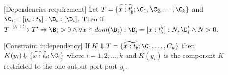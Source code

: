 \vspace{0.5cm}
\begin{proposition} [Dependencies requirement] Let $T=\{\widetilde{x:t_b'};\C_1,\C_2, \dots, \C_k\}$ and $\C_i=[y_i:t_b]:\B_i:[\D_i]$. Then if  $T\xrightarrow{\text{$y_i:t_b$}}T' \Rightarrow \B_i>0 \wedge \forall x \in dom(\D_i): \D_i=[x:t_b'']:N,\D_i' \wedge N>0. $




\end{proposition}





\begin{proposition} [Constraint independency] If $K\Downarrow T=\{\widetilde{x:t_b};\C_1,\dots, C_k\}$ then $K(y_i)\Downarrow \{\widetilde{x:t_b};\C_i\}$ where $i=1,2, \dots, k$ and  $K(y_i)$ is the component $K$ restricted to the one output port-port $y_i$.


\end{proposition}